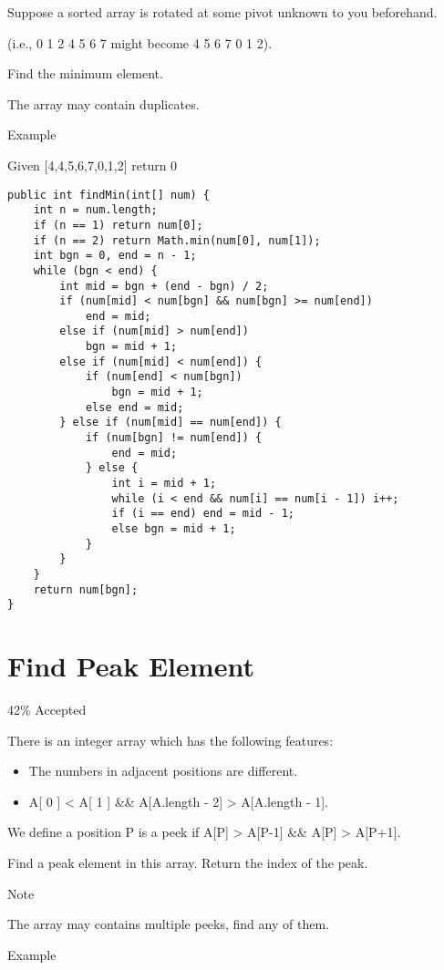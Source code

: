 \documentclass[9pt, b5paaper]{book}
\begin{document}
Suppose a sorted array is rotated at some pivot unknown to you beforehand.

(i.e., 0 1 2 4 5 6 7 might become 4 5 6 7 0 1 2).

Find the minimum element.

The array may contain duplicates.

Example

Given [4,4,5,6,7,0,1,2] return 0
\begin{verbatim}
public int findMin(int[] num) {
    int n = num.length;
    if (n == 1) return num[0];
    if (n == 2) return Math.min(num[0], num[1]);
    int bgn = 0, end = n - 1;
    while (bgn < end) {
        int mid = bgn + (end - bgn) / 2;
        if (num[mid] < num[bgn] && num[bgn] >= num[end])
            end = mid;
        else if (num[mid] > num[end])
            bgn = mid + 1;
        else if (num[mid] < num[end]) {
            if (num[end] < num[bgn])
                bgn = mid + 1;
            else end = mid;
        } else if (num[mid] == num[end]) {
            if (num[bgn] != num[end]) {
                end = mid;
            } else {
                int i = mid + 1;
                while (i < end && num[i] == num[i - 1]) i++;
                if (i == end) end = mid - 1;
                else bgn = mid + 1;
            }
        }
    }
    return num[bgn];
}
\end{verbatim}
\section{Find Peak Element}
\label{sec-1-30}

42\% Accepted

There is an integer array which has the following features:

\begin{itemize}
\item The numbers in adjacent positions are different.

\item A[ 0 ] < A[ 1 ] \&\& A[A.length - 2] > A[A.length - 1].
\end{itemize}

We define a position P is a peek if A[P] > A[P-1] \&\& A[P] > A[P+1].

Find a peak element in this array. Return the index of the peak.

Note

The array may contains multiple peeks, find any of them.

Example
\end{document}

